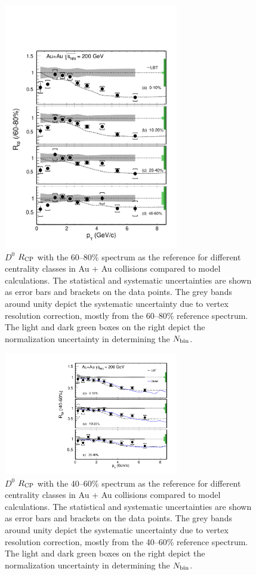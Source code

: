 \begin{figure}
\centering
\includegraphics[width=0.68\textwidth]{figure/Run14_D0HFT/D0_Rcp11.pdf}
\caption{$D^{0}$ $R_{\rm CP}$ with the 60--80\% spectrum as the reference for different centrality classes in Au + Au collisions compared to model calculations. The statistical and systematic uncertainties are shown as error bars and brackets on the data points. The grey bands around unity depict the systematic uncertainty due to vertex resolution correction, mostly from the 60--80\% reference spectrum. The light and dark green boxes on the right depict the normalization uncertainty in determining the $N_{\rm bin}$.}
\label{figure:D0_Rcp11} 
\end{figure}

\begin{figure}
\centering
\includegraphics[width=0.68\textwidth]{figure/Run14_D0HFT/D0_Rcp22.pdf}
\caption{$D^{0}$ $R_{\rm CP}$ with the 40--60\% spectrum as the reference for different centrality classes in Au + Au collisions compared to model calculations. The statistical and systematic uncertainties are shown as error bars and brackets on the data points. The grey bands around unity depict the systematic uncertainty due to vertex resolution correction, mostly from the 40--60\% reference spectrum. The light and dark green boxes on the right depict the normalization uncertainty in determining the $N_{\rm bin}$.}
\label{figure:D0_Rcp22} 
\end{figure}


